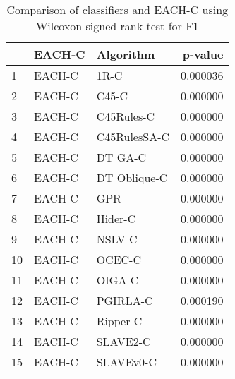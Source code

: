 \begin{table}
\footnotesize
\caption{Comparison of classifiers and EACH-C using Wilcoxon signed-rank test for F1}
\label{tab:EACH-C wilcoxon F1 comparison}
\begin{tabular}{lllr}
\hline
 & EACH-C & Algorithm & p-value \\
\hline
1 & EACH-C & 1R-C & 0.000036 \\
2 & EACH-C & C45-C & 0.000000 \\
3 & EACH-C & C45Rules-C & 0.000000 \\
4 & EACH-C & C45RulesSA-C & 0.000000 \\
5 & EACH-C & DT GA-C & 0.000000 \\
6 & EACH-C & DT Oblique-C & 0.000000 \\
7 & EACH-C & GPR & 0.000000 \\
8 & EACH-C & Hider-C & 0.000000 \\
9 & EACH-C & NSLV-C & 0.000000 \\
10 & EACH-C & OCEC-C & 0.000000 \\
11 & EACH-C & OIGA-C & 0.000000 \\
12 & EACH-C & PGIRLA-C & 0.000190 \\
13 & EACH-C & Ripper-C & 0.000000 \\
14 & EACH-C & SLAVE2-C & 0.000000 \\
15 & EACH-C & SLAVEv0-C & 0.000000 \\
\hline
\end{tabular}
\end{table}
